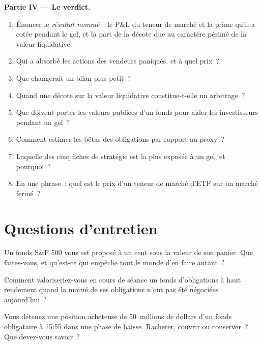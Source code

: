 \begin{problem}
\medskip\noindent\textbf{Partie IV --- Le verdict.}
\begin{enumerate}[resume]
\item Énoncer le \emph{résultat nommé}~: le P\&L du teneur de marché et la prime qu'il a cotée pendant le gel, et la part de la décote due au caractère périmé de la
valeur liquidative.
\item Qui a absorbé les actions des vendeurs paniqués, et à quel prix~?
\item Que changerait un bilan plus petit~?
\item Quand une décote sur la valeur liquidative constitue-t-elle un arbitrage~?
\item Que doivent porter les valeurs publiées d'un fonds pour aider les investisseurs pendant un gel~?
\item Comment estimer les bêtas des obligations par rapport au proxy~?
\item Laquelle des cinq fiches de stratégie est la plus exposée à un gel, et pourquoi~?
\item En une phrase~: quel est le prix d'un teneur de marché d'ETF sur un marché fermé~?
\end{enumerate}
\end{problem}

\section{Questions d'entretien}

\begin{interviewq}\label{iq:hf:etf-market-making:1}
Un fonds S\&P 500 vous est proposé à un cent sous la valeur de son panier. Que faites-vous, et qu'est-ce qui empêche tout le monde d'en faire autant~?
\end{interviewq}

\begin{interviewq}\label{iq:hf:etf-market-making:2}
Comment valoriseriez-vous en cours de séance un fonds d'obligations à haut rendement quand la moitié de ses obligations n'ont pas été négociées aujourd'hui~?
\end{interviewq}

\begin{interviewq}\label{iq:hf:etf-market-making:3}
Vous détenez une position acheteuse de 50~millions de dollars d'un fonds obligataire à 15:55 dans une phase de baisse. Racheter, couvrir ou conserver~? Que devez-vous savoir~?
\end{interviewq}

